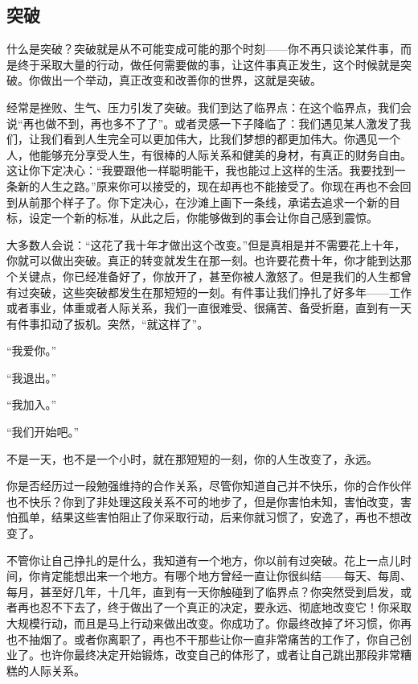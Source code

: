 \subsection{突破}

什么是突破？突破就是从不可能变成可能的那个时刻——你不再只谈论某件事，而是终于采取大量的行动，做任何需要做的事，让这件事真正发生，这个时候就是突破。你做出一个举动，真正改变和改善你的世界，这就是突破。

经常是挫败、生气、压力引发了突破。我们到达了临界点：在这个临界点，我们会说“再也做不到，再也多不了了”。或者灵感一下子降临了：我们遇见某人激发了我们，让我们看到人生完全可以更加伟大，比我们梦想的都更加伟大。你遇见一个人，他能够充分享受人生，有很棒的人际关系和健美的身材，有真正的财务自由。这让你下定决心：“我要跟他一样聪明能干，我也能过上这样的生活。我要找到一条新的人生之路。”原来你可以接受的，现在却再也不能接受了。你现在再也不会回到从前那个样子了。你下定决心，在沙滩上画下一条线，承诺去追求一个新的目标，设定一个新的标准，从此之后，你能够做到的事会让你自己感到震惊。

大多数人会说：“这花了我十年才做出这个改变。”但是真相是并不需要花上十年，你就可以做出突破。真正的转变就发生在那一刻。也许要花费十年，你才能到达那个关键点，你已经准备好了，你放开了，甚至你被人激怒了。但是我们的人生都曾有过突破，这些突破都发生在那短短的一刻。有件事让我们挣扎了好多年——工作或者事业，体重或者人际关系，我们一直很难受、很痛苦、备受折磨，直到有一天有件事扣动了扳机。突然，“就这样了”。

“我爱你。”

“我退出。”

“我加入。”

“我们开始吧。”

不是一天，也不是一个小时，就在那短短的一刻，你的人生改变了，永远。

你是否经历过一段勉强维持的合作关系，尽管你知道自己并不快乐，你的合作伙伴也不快乐？你到了非处理这段关系不可的地步了，但是你害怕未知，害怕改变，害怕孤单，结果这些害怕阻止了你采取行动，后来你就习惯了，安逸了，再也不想改变了。

不管你让自己挣扎的是什么，我知道有一个地方，你以前有过突破。花上一点儿时间，你肯定能想出来一个地方。有哪个地方曾经一直让你很纠结——每天、每周、每月，甚至好几年，十几年，直到有一天你触碰到了临界点？你突然受到启发，或者再也忍不下去了，终于做出了一个真正的决定，要永远、彻底地改变它！你采取大规模行动，而且是马上行动来做出改变。你成功了。你最终改掉了坏习惯，你再也不抽烟了。或者你离职了，再也不干那些让你一直非常痛苦的工作了，你自己创业了。也许你最终决定开始锻炼，改变自己的体形了，或者让自己跳出那段非常糟糕的人际关系。

